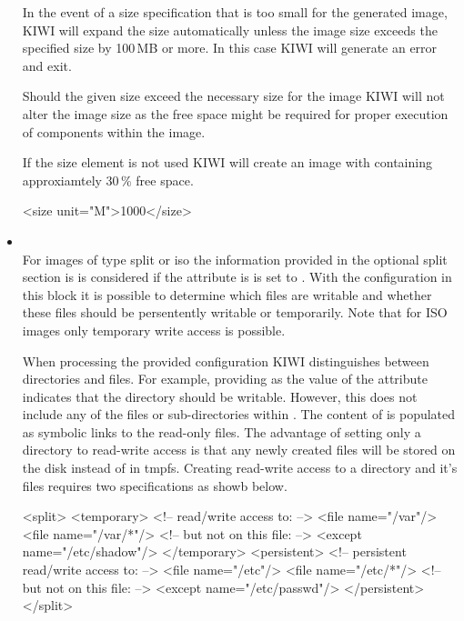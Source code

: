\begin{itemize}
    In the event of a size specification that is too small for the
    generated image, KIWI will expand the size automatically unless the
    image size exceeds the specified size by 100\,MB or more. In this case
    KIWI will generate an error and exit.

    Should the given size exceed the necessary size for the image KIWI will
    not alter the image size as the free space might be required for proper
    execution of components within the image.

    If the size element is not used KIWI will create an image with
    containing approxiamtely 30\,\% free space.
    
     
\begin{xml}
<size unit="M">1000</size>
\end{xml}

\item {}\\
    For images of type split or iso the information provided in the optional
    split section is is considered if the  attribute is
    is set to . With the configuration in this block it is
    possible to determine which files are writable and whether these files
    should be persentently writable or temporarily. Note that for ISO images
    only temporary write access is possible.

    When processing the provided configuration KIWI distinguishes between
    directories and files. For example, providing  as the value of
    the  attribute indicates that the  directory should be
    writable. However, this does not include any of the files or 
    sub-directories within . The content of  is populated as 
    symbolic links to the read-only files. The advantage of setting only a
    directory to read-write access is that any newly created files will be
    stored on the disk instead of in tmpfs. Creating read-write access to a 
    directory and it's files requires two specifications as showb below.

\begin{xml}
<split>
  <temporary>
    <!-- read/write access to: -->
    <file name="/var"/>
    <file name="/var/*"/>
    <!-- but not on this file: -->
    <except name="/etc/shadow"/>
  </temporary>
  <persistent>
    <!-- persistent read/write access to: -->
    <file name="/etc"/>
    <file name="/etc/*"/>
    <!-- but not on this file: -->
    <except name="/etc/passwd"/>
  </persistent>
</split>
\end{xml}


\end{itemize}
